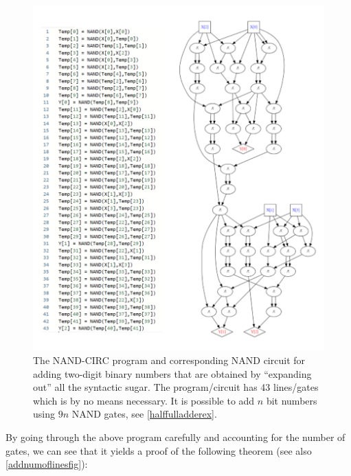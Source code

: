 \begin{figure}
\centering
\includegraphics[width=\textwidth, height=0.25\paperheight, keepaspectratio]{../figure/add2bitnumbers.png}
\caption{The NAND-CIRC program and corresponding NAND circuit for adding
two-digit binary numbers that are obtained by ``expanding out'' all the
syntactic sugar. The program/circuit has 43 lines/gates which is by no
means necessary. It is possible to add \(n\) bit numbers using \(9n\)
NAND gates, see \cref{halffulladderex}.}
\label{add2bitnumbersfig}
\end{figure}

By going through the above program carefully and accounting for the
number of gates, we can see that it yields a proof of the following
theorem (see also \cref{addnumoflinesfig}):

\hypertarget{addition-thm}{}


